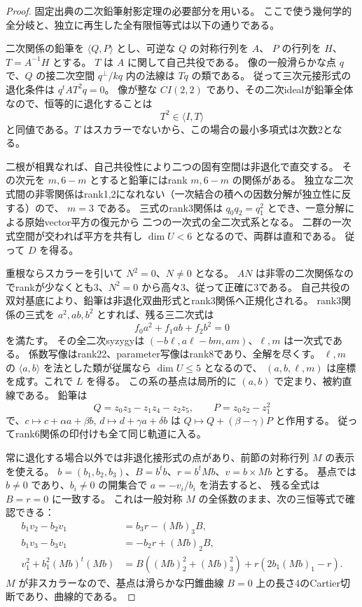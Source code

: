 \begin{proof}
固定出典\cite{AS4CYpinned}の二次鉛筆射影定理の必要部分を用いる。
ここで使う幾何学的全分岐と、独立に再生した全有限恒等式は以下の通りである。

二次関係の鉛筆を $\langle Q,P\rangle$ とし、可逆な $Q$ の対称行列を $A$、
$P$ の行列を $H$、$T=A^{-1}H$ とする。
$T$ は $A$ に関して自己共役である。
像の一般滑らかな点 $q$ で、$Q$ の接二次空間 $q^\perp/kq$ 内の法線は $Tq$ の類である。
従って三次元接形式の退化条件は $q^tAT^2q=0$。
像が整な $CI(2,2)$ であり、その二次idealが鉛筆全体なので、恒等的に退化することは
\[
 T^2\in\langle I,T\rangle
\]
と同値である。$T$ はスカラーでないから、この場合の最小多項式は次数2となる。

二根が相異なれば、自己共役性により二つの固有空間は非退化で直交する。
その次元を $m,6-m$ とすると鉛筆にはrank $m,6-m$ の関係がある。
独立な二次式間の非零関係はrank1,2になれない（一次結合の積への因数分解が独立性に反する）ので、
$m=3$ である。
三式のrank3関係は $q_0q_2=q_1^2$ とでき、一意分解による原始vector平方の復元から
二つの一次式の全二次式系となる。
二群の一次式空間が交われば平方を共有し $\dim U<6$ となるので、両群は直和である。
従って $D$ を得る。

重根ならスカラーを引いて $N^2=0$、$N\ne0$ となる。
$AN$ は非零の二次関係なのでrankが少なくとも3、$N^2=0$ から高々3、従って正確に3である。
自己共役の双対基底により、鉛筆は非退化双曲形式とrank3関係へ正規化される。
rank3関係の三式を $a^2,ab,b^2$ とすれば、残る三二次式は
\[
 f_0a^2+f_1ab+f_2b^2=0
\]
を満たす。
その全二次syzygyは $(-b\ell,a\ell-bm,am)$、$\ell,m$ は一次式である。
係数写像はrank22、parameter写像はrank8であり、全解を尽くす。
$\ell,m$ の $\langle a,b\rangle$ を法とした類が従属なら $\dim U\le5$ となるので、
$(a,b,\ell,m)$ は座標を成す。これで $L$ を得る。
この系の基点は局所的に $(a,b)$ で定まり、被約直線である。
鉛筆は
\[
 Q=z_0z_3-z_1z_4-z_2z_5,\qquad P=z_0z_2-z_1^2
\]
で、$c\mapsto c+\alpha a+\beta b$, $d\mapsto d+\gamma a+\delta b$ は
$Q\mapsto Q+(\beta-\gamma)P$ と作用する。
従ってrank6関係の印付けも全て同じ軌道に入る。

常に退化する場合以外では非退化接形式の点があり、前節の対称行列 $M$ の表示を使える。
$b=(b_1,b_2,b_3)$、$B=b^tb$、$r=b^tMb$、$v=b\times Mb$ とする。
基点では $b\ne0$ であり、$b_i\ne0$ の開集合で $a=-v_i/b_i$ を消去すると、
残る全式は $B=r=0$ に一致する。
これは一般対称 $M$ の全係数のまま、次の三恒等式で確認できる：
\[
\begin{aligned}
 b_1v_2-b_2v_1&=b_3r-(Mb)_3B,\\
 b_1v_3-b_3v_1&=-b_2r+(Mb)_2B,\\
 v_1^2+b_1^2(Mb)^t(Mb)&=B((Mb)_2^2+(Mb)_3^2)+r(2b_1(Mb)_1-r).
\end{aligned}
\]
$M$ が非スカラーなので、基点は滑らかな円錐曲線 $B=0$ 上の長さ4のCartier切断であり、曲線的である。


\end{proof}
